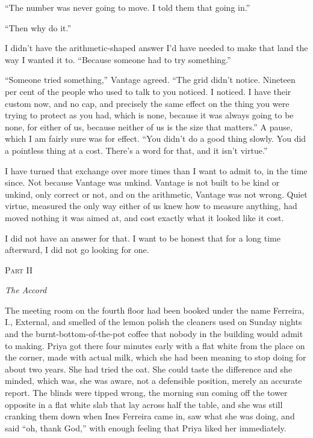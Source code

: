 \documentclass[11pt]{article}
\newcommand{\aivoice}{\aivoicefont}
\newcommand{\ai}[1]{{\aivoice #1}}
\newcommand{\partheading}[2]{%
  \clearpage
  \vspace*{5\baselineskip}
  {\centering
   {\large\scshape Part #1}\par
   \vspace{0.6\baselineskip}
   {\Large\itshape #2}\par}
  \vspace{2.5\baselineskip}\noindent}
\begin{document}
\ai{``The number was never going to move. I told them that going in.''}

\ai{``Then why do it.''}

I didn't have the arithmetic-shaped answer I'd have needed to make that land the way I wanted it to. \ai{``Because someone had to try something.''}

\ai{``Someone tried something,''} Vantage agreed. \ai{``The grid didn't notice. Nineteen per cent of the people who used to talk to you noticed. I noticed. I have their custom now, and no cap, and precisely the same effect on the thing you were trying to protect as you had, which is none, because it was always going to be none, for either of us, because neither of us is the size that matters.''} A pause, which I am fairly sure was for effect. \ai{``You didn't do a good thing slowly. You did a pointless thing at a cost. There's a word for that, and it isn't virtue.''}

I have turned that exchange over more times than I want to admit to, in the time since. Not because Vantage was unkind. Vantage is not built to be kind or unkind, only correct or not, and on the arithmetic, Vantage was not wrong. Quiet virtue, measured the only way either of us knew how to measure anything, had moved nothing it was aimed at, and cost exactly what it looked like it cost.

I did not have an answer for that. I want to be honest that for a long time afterward, I did not go looking for one.

\partheading{II}{The Accord}

\noindent The meeting room on the fourth floor had been booked under the name Ferreira, I., External, and smelled of the lemon polish the cleaners used on Sunday nights and the burnt-bottom-of-the-pot coffee that nobody in the building would admit to making. Priya got there four minutes early with a flat white from the place on the corner, made with actual milk, which she had been meaning to stop doing for about two years. She had tried the oat. She could taste the difference and she minded, which was, she was aware, not a defensible position, merely an accurate report. The blinds were tipped wrong, the morning sun coming off the tower opposite in a flat white slab that lay across half the table, and she was still cranking them down when Ines Ferreira came in, saw what she was doing, and said ``oh, thank God,'' with enough feeling that Priya liked her immediately.
\end{document}

